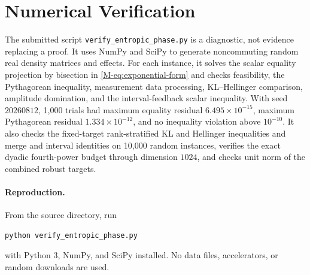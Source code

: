 \documentclass[twoside]{article}
\begin{document}
\section{Numerical Verification}
\label{app:numerics}

The submitted script \texttt{verify\_entropic\_phase.py} is a diagnostic, not evidence replacing a proof. It uses NumPy and SciPy to generate noncommuting random real density matrices and effects. For each instance, it solves the scalar equality projection by bisection in \eqref{M-eq:exponential-form} and checks feasibility, the Pythagorean inequality, measurement data processing, KL--Hellinger comparison, amplitude domination, and the interval-feedback scalar inequality. With seed $20260812$, 1,000 trials had maximum equality residual $6.495\times10^{-15}$, maximum Pythagorean residual $1.334\times10^{-12}$, and no inequality violation above $10^{-10}$. It also checks the fixed-target rank-stratified KL and Hellinger inequalities and merge and interval identities on 10,000 random instances, verifies the exact dyadic fourth-power budget through dimension $1024$, and checks unit norm of the combined robust targets.

\paragraph{Reproduction.} From the source directory, run
\begin{verbatim}
python verify_entropic_phase.py
\end{verbatim}
with Python 3, NumPy, and SciPy installed. No data files, accelerators, or random downloads are used.


\end{document}
